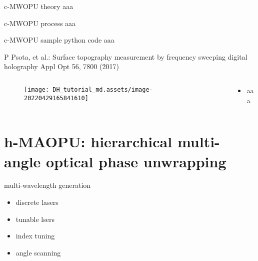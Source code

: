 \documentclass[t, aspectratio=169]{beamer}
\begin{document}
\begin{frame}{c-MWOPU theory}
aaa
\end{frame}


\begin{frame}{c-MWOPU process}
aaa
\end{frame}


\begin{frame}{c-MWOPU sample python code}
aaa
\end{frame}


\begin{frame}{P Psota, et al.: Surface topography measurement by frequency sweeping digital holography}
	\vspace{-3 mm}
	\small Appl Opt 56, 7800 (2017)
	\begin{columns}
		\begin{column}{.6\textwidth}
			\begin{figure}
				\texttt{[image: DH\_tutorial\_md.assets/image-20220429165841610]}
			\end{figure}
		\end{column}
		\begin{column}{.4\textwidth}
			\begin{itemize}
				\item aaa
			\end{itemize}
		\end{column}
	\end{columns}
\end{frame}




\section{h-MAOPU: hierarchical multi-angle optical phase unwrapping}
\begin{frame}[c]
	\centering\LARGE\textbf{\secname}
\end{frame}


\begin{frame}{multi-wavelength generation}
	\begin{itemize}
		\item discrete lasers
		\item tunable lsers
		\item index tuning
		\item angle scanning
	\end{itemize}
\end{frame}
\end{document}
